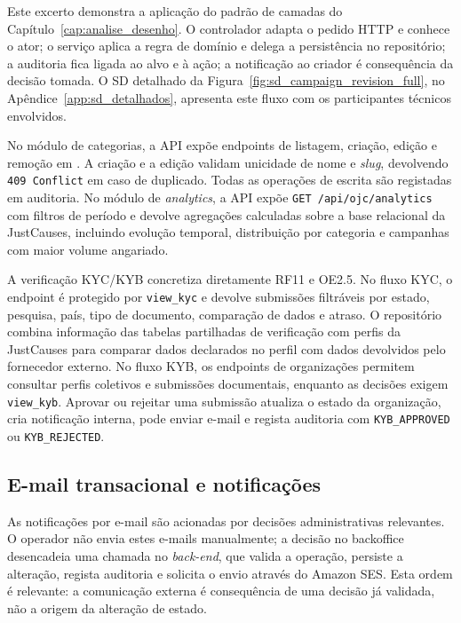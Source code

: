 Este excerto demonstra a aplicação do padrão de camadas do Capítulo~\ref{cap:analise_desenho}. O controlador adapta o pedido HTTP e conhece o ator; o serviço aplica a regra de domínio e delega a persistência no repositório; a auditoria fica ligada ao alvo e à ação; a notificação ao criador é consequência da decisão tomada. O SD detalhado da Figura~\ref{fig:sd_campaign_revision_full}, no Apêndice~\ref{app:sd_detalhados}, apresenta este fluxo com os participantes técnicos envolvidos.

No módulo de categorias, a \gls{API} expõe endpoints de listagem, criação, edição e remoção em . A criação e a edição validam unicidade de nome e \textit{slug}, devolvendo \texttt{409 Conflict} em caso de duplicado. Todas as operações de escrita são registadas em auditoria. No módulo de \textit{analytics}, a \gls{API} expõe \texttt{GET /api/ojc/analytics} com filtros de período e devolve agregações calculadas sobre a base relacional da JustCauses, incluindo evolução temporal, distribuição por categoria e campanhas com maior volume angariado.

A verificação KYC/KYB concretiza diretamente RF11 e OE2.5. No fluxo KYC, o endpoint  é protegido por \texttt{view\_kyc} e devolve submissões filtráveis por estado, pesquisa, país, tipo de documento, comparação de dados e atraso. O repositório combina informação das tabelas partilhadas de verificação com perfis da JustCauses para comparar dados declarados no perfil com dados devolvidos pelo fornecedor externo. No fluxo KYB, os endpoints de organizações permitem consultar perfis coletivos e submissões documentais, enquanto as decisões exigem \texttt{view\_kyb}. Aprovar ou rejeitar uma submissão atualiza o estado da organização, cria notificação interna, pode enviar e-mail e regista auditoria com \texttt{KYB\_APPROVED} ou \texttt{KYB\_REJECTED}.

\subsection{E-mail transacional e notificações}
\label{subsec:impl_email_notifications}

As notificações por e-mail são acionadas por decisões administrativas relevantes. O operador não envia estes e-mails manualmente; a decisão no backoffice desencadeia uma chamada no \textit{back-end}, que valida a operação, persiste a alteração, regista auditoria e solicita o envio através do Amazon SES. Esta ordem é relevante: a comunicação externa é consequência de uma decisão já validada, não a origem da alteração de estado.

